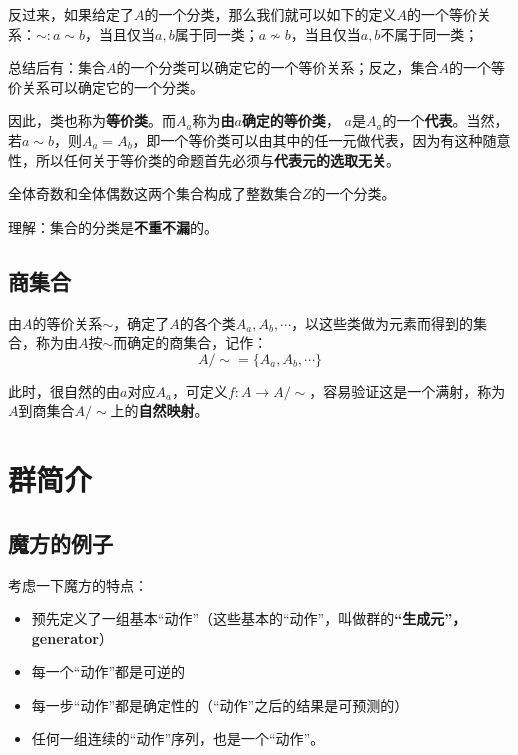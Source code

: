 \documentclass[12pt]{article}
\begin{document}
反过来，如果给定了$A$的一个分类，那么我们就可以如下的定义$A$的一个等价关系：$\sim: a \sim b$，当且仅当$a,b$属于同一类；$a \nsim b$，当且仅当$a,b$不属于同一类；

总结后有：集合$A$的一个分类可以确定它的一个等价关系；反之，集合$A$的一个等价关系可以确定它的一个分类。

因此，类也称为\textbf{等价类}。而$A_a$称为\textbf{由$a$确定的等价类}， $a$是$A_a$的一个\textbf{代表}。当然，若$a \sim b$，则$A_a = A_b$，即一个等价类可以由其中的任一元做代表，因为有这种随意性，所以任何关于等价类的命题首先必须与\textbf{代表元的选取无关}。

\begin{framed}
\small {
全体奇数和全体偶数这两个集合构成了整数集合$Z$的一个分类。

理解：集合的分类是\textbf{不重不漏}的。
}
\end{framed}

\subsection{商集合}
由$A$的等价关系$\sim$，确定了$A$的各个类$A_a, A_b, \cdots$，以这些类做为元素而得到的集合，称为由$A$按$\sim$而确定的商集合，记作：
$$
A / \sim = \{A_a, A_b, \cdots \}
$$

此时，很自然的由$a$对应$A_a$，可定义$f: A \rightarrow A/\sim$，容易验证这是一个满射，称为$A$到商集合$A/\sim$上的\textbf{自然映射}。

\section{群简介}
\subsection{魔方的例子}
考虑一下魔方的特点：
\begin{itemize}
\setlength{\itemsep}{0pt}
\setlength{\parsep}{0pt}
\setlength{\parskip}{0pt}
    \item 预先定义了一组基本“动作”（这些基本的“动作”，叫做群的\textbf{“生成元”，generator}）
    \item 每一个“动作”都是可逆的
    \item 每一步“动作”都是确定性的（“动作”之后的结果是可预测的）
    \item 任何一组连续的“动作”序列，也是一个“动作”。
\end{itemize}
\end{document}
